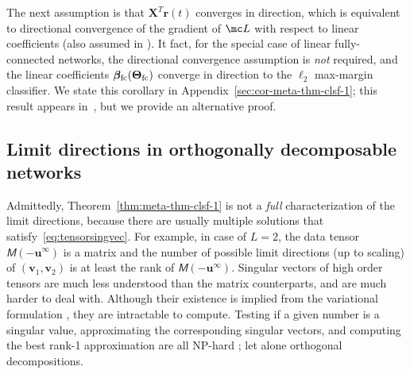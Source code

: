 \documentclass{article} %
\def\vr{{\bm{r}}}
\def\vu{{\bm{u}}}
\def\vv{{\bm{v}}}
\def\mX{{\bm{X}}}
\newcommand{\tens}[1]{\bm{\mathsfit{#1}}}
\def\tM{{\tens{M}}}
\newcommand{\vbeta}{{\bm{\beta}}}
\newcommand{\vbetafc}{\vbeta_{\rm fc}}
\newcommand{\bTheta}{\bm{\Theta}}
\newcommand{\bThetafc}{\bTheta_{\rm fc}}
\begin{document}
The next assumption is that $\mX^T \vr(t)$ converges in direction, which is equivalent to directional convergence of the gradient of $\mc L$ with respect to linear coefficients (also assumed in \citet{gunasekar2018implicit}).
It fact, for the special case of linear fully-connected networks, the directional convergence assumption is \emph{not} required, and the linear coefficients $\vbetafc(\bThetafc)$ converge in direction to the $\ell_2$ max-margin classifier. We state this corollary in Appendix~\ref{sec:cor-meta-thm-clsf-1};
this result appears in~\citet{ji2020directional}, but we provide an alternative proof.

\subsection{Limit directions in orthogonally decomposable networks}
\label{sec:meta-thms-clsf-2}
Admittedly, Theorem~\ref{thm:meta-thm-clsf-1} is not a \emph{full} characterization of the limit directions, because there are usually multiple solutions that satisfy~\eqref{eq:tensorsingvec}.
For example, in case of $L=2$, the data tensor $\tM(-\vu^\infty)$ is a matrix and the number of possible limit directions (up to scaling) of $(\vv_1, \vv_2)$ is at least the rank of $\tM(-\vu^\infty)$.
Singular vectors of high order tensors are much less understood than the matrix counterparts, and are much harder to deal with.
Although their existence is implied from the variational formulation \citep{lim2005singular}, they are intractable to compute. Testing if a given number is a singular value, approximating the corresponding singular vectors, and computing the best rank-1 approximation are all NP-hard \citep{hillar2013most}; let alone orthogonal decompositions.

\end{document}
